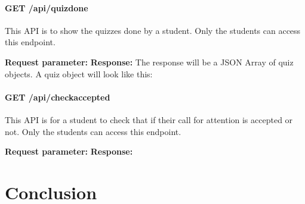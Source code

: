 \documentclass[a4paper, 11pt,openany]{book} %
\begin{document}
\subsubsection{GET /api/quizdone}
This API is to show the quizzes done by a student. Only the students can access this endpoint.  \par
\textbf{Request parameter:}
\textbf{Response:}
The response will be a JSON Array of quiz objects. A quiz object will look like this:

\subsubsection{GET /api/checkaccepted}
This API is for a student to check that if their call for attention is accepted or not. Only the students can access this endpoint.  \par
\textbf{Request parameter:}
\textbf{Response:}
\chapter{Conclusion}
\printbibliography[title = References]
\end{document}
